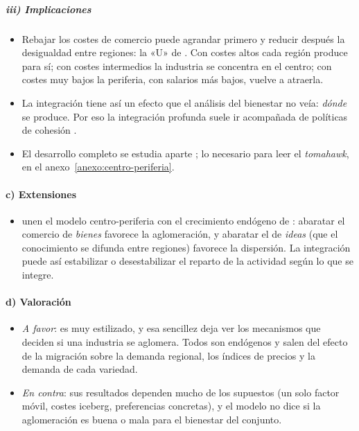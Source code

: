 \documentclass[11pt]{article}
\begin{document}
\subparagraph{iii) Implicaciones}

\begin{itemize}
\item Rebajar los costes de comercio puede agrandar primero y reducir después la desigualdad entre regiones: la «U» de \textcite{KrugmanVenables1995Globalization} . Con costes altos cada región produce para sí; con costes intermedios la industria se concentra en el centro; con costes muy bajos la periferia, con salarios más bajos, vuelve a atraerla.
\item La integración tiene así un efecto que el análisis del bienestar no veía: \emph{dónde} se produce. Por eso la integración profunda suele ir acompañada de políticas de cohesión .
\item El desarrollo completo se estudia aparte ; lo necesario para leer el \emph{tomahawk}, en el anexo~\ref{anexo:centro-periferia}.
\end{itemize}

\paragraph{c) Extensiones}

\begin{itemize}
\item \textcite{BaldwinForslid2000Core} unen el modelo centro-periferia con el crecimiento endógeno de \textcite{Romer1990Endogenous}: abaratar el comercio de \emph{bienes} favorece la aglomeración, y abaratar el de \emph{ideas} (que el conocimiento se difunda entre regiones) favorece la dispersión. La integración puede así estabilizar o desestabilizar el reparto de la actividad según lo que se integre.
\end{itemize}

\paragraph{d) Valoración}

\begin{itemize}
\item \emph{A favor}: es muy estilizado, y esa sencillez deja ver los mecanismos que deciden si una industria se aglomera. Todos son endógenos y salen del efecto de la migración sobre la demanda regional, los índices de precios y la demanda de cada variedad.
\item \emph{En contra}: sus resultados dependen mucho de los supuestos (un solo factor móvil, costes iceberg, preferencias concretas), y el modelo no dice si la aglomeración es buena o mala para el bienestar del conjunto.
\end{itemize}
\end{document}
